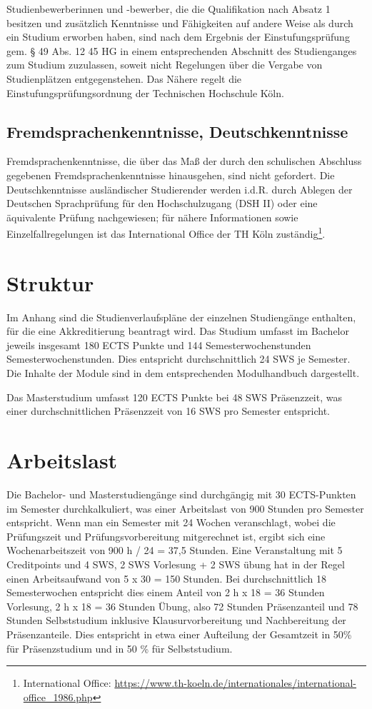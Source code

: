 Studienbewerberinnen und -bewerber, die die Qualifikation nach Absatz 1
besitzen und zusätzlich Kenntnisse und Fähigkeiten auf andere Weise als
durch ein Studium erworben haben, sind nach dem Ergebnis der
Einstufungsprüfung gem. § 49 Abs. 12 45 HG in einem entsprechenden
Abschnitt des Studienganges zum Studium zuzulassen, soweit nicht
Regelungen über die Vergabe von Studienplätzen entgegenstehen. Das
Nähere regelt die Einstufungsprüfungsordnung der Technischen Hochschule
Köln.

\subsection{Fremdsprachenkenntnisse,
Deutschkenntnisse}\label{fremdsprachenkenntnisse-deutschkenntnisse-1}

Fremdsprachenkenntnisse, die über das Maß der durch den schulischen
Abschluss gegebenen Fremdsprachenkenntnisse hinausgehen, sind nicht
gefordert. Die Deutschkenntnisse ausländischer Studierender werden
i.d.R. durch Ablegen der Deutschen Sprachprüfung für den Hochschulzugang
(DSH II) oder eine äquivalente Prüfung nachgewiesen; für nähere
Informationen sowie Einzelfallregelungen ist das International Office
der TH Köln zuständig\footnote{International Office:
  \url{https://www.th-koeln.de/internationales/international-office\_1986.php}}.

\section{Struktur}\label{struktur}

Im Anhang sind die Studienverlaufspläne der einzelnen Studiengänge
enthalten, für die eine Akkreditierung beantragt wird. Das Studium
umfasst im Bachelor jeweils insgesamt 180 ECTS Punkte und 144
Semesterwochenstunden Semesterwochenstunden. Dies entspricht
durchschnittlich 24 SWS je Semester. Die Inhalte der Module sind in dem
entsprechenden Modulhandbuch dargestellt.

Das Masterstudium umfasst 120 ECTS Punkte bei 48 SWS Präsenzzeit, was
einer durchschnittlichen Präsenzzeit von 16 SWS pro Semester entspricht.

\section{Arbeitslast}\label{arbeitslast}

Die Bachelor- und Masterstudiengänge sind durchgängig mit 30
ECTS-Punkten im Semester durchkalkuliert, was einer Arbeitslast von 900
Stunden pro Semester entspricht. Wenn man ein Semester mit 24 Wochen
veranschlagt, wobei die Prüfungszeit und Prüfungsvorbereitung
mitgerechnet ist, ergibt sich eine Wochenarbeitszeit von 900 h / 24 =
37,5 Stunden. Eine Veranstaltung mit 5 Creditpoints und 4 SWS, 2 SWS
Vorlesung + 2 SWS übung hat in der Regel einen Arbeitsaufwand von 5 x 30
= 150 Stunden. Bei durchschnittlich 18 Semesterwochen entspricht dies
einem Anteil von 2 h x 18 = 36 Stunden Vorlesung, 2 h x 18 = 36 Stunden
Übung, also 72 Stunden Präsenzanteil und 78 Stunden Selbststudium
inklusive Klausurvorbereitung und Nachbereitung der Präsenzanteile. Dies
entspricht in etwa einer Aufteilung der Gesamtzeit in 50\% für
Präsenzstudium und in 50 \% für Selbststudium.

